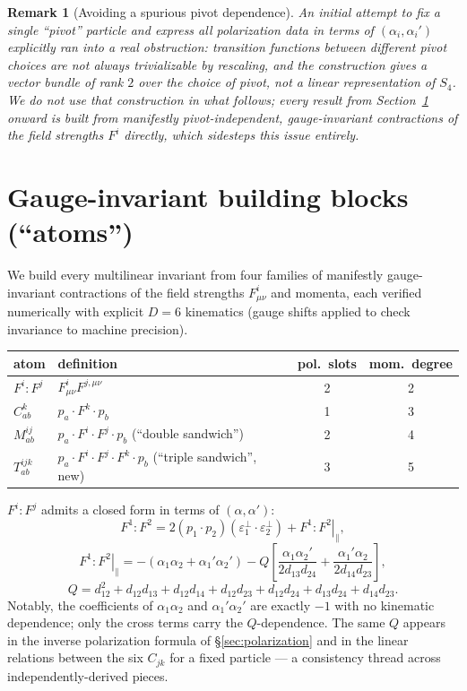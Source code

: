 \documentclass[reqno]{amsart}
\newtheorem{remark}[theorem]{Remark}
\begin{document}
\begin{remark}[Avoiding a spurious pivot dependence]
An initial attempt to fix a single ``pivot'' particle and express all polarization data in terms
of $(\alpha_i,\alpha_i')$ explicitly ran into a real obstruction: transition functions between
different pivot choices are not always trivializable by rescaling, and the construction gives a
\emph{vector bundle of rank $2$ over the choice of pivot}, not a linear representation of $S_4$.
We do not use that construction in what follows; every result from Section~\ref{sec:atoms} onward
is built from manifestly pivot-independent, gauge-invariant contractions of the field strengths
$F^i$ directly, which sidesteps this issue entirely.
\end{remark}

\section{Gauge-invariant building blocks (``atoms'')}
\label{sec:atoms}

We build every multilinear invariant from four families of manifestly gauge-invariant
contractions of the field strengths $F^i_{\mu\nu}$ and momenta, each verified numerically with
explicit $D=6$ kinematics (gauge shifts applied to check invariance to machine precision).

\begin{center}
\small
\begin{tabular}{@{}l p{5.2cm} c c@{}}
\hline
atom & definition & pol.\ slots & mom.\ degree \\
\hline
$F^i{:}F^j$ & $F^i_{\mu\nu}F^{j,\mu\nu}$ & 2 & 2 \\[2pt]
$C^k_{ab}$ & $p_a\cdot F^k\cdot p_b$ & 1 & 3 \\[2pt]
$M^{ij}_{ab}$ & $p_a\cdot F^i\cdot F^j\cdot p_b$ (``double sandwich'') & 2 & 4 \\[2pt]
$T^{ijk}_{ab}$ & $p_a\cdot F^i\cdot F^j\cdot F^k\cdot p_b$ (``triple sandwich'', new) & 3 & 5 \\
\hline
\end{tabular}
\end{center}

$F^i{:}F^j$ admits a closed form in terms of $(\alpha,\alpha')$:
\[
F^1{:}F^2 = 2(p_1\cdot p_2)(\varepsilon_1^\perp\cdot\varepsilon_2^\perp) + \left.F^1{:}F^2\right|_\parallel,
\]
\[
\left.F^1{:}F^2\right|_\parallel = -(\alpha_1\alpha_2+\alpha_1'\alpha_2')
- Q\left[\frac{\alpha_1\alpha_2'}{2d_{13}d_{24}}+\frac{\alpha_1'\alpha_2}{2d_{14}d_{23}}\right],
\]
\[
Q = d_{12}^2+d_{12}d_{13}+d_{12}d_{14}+d_{12}d_{23}+d_{12}d_{24}+d_{13}d_{24}+d_{14}d_{23}.
\]
Notably, the coefficients of $\alpha_1\alpha_2$ and $\alpha_1'\alpha_2'$ are exactly $-1$ with no
kinematic dependence; only the cross terms carry the $Q$-dependence. The same $Q$ appears in the
inverse polarization formula of \S\ref{sec:polarization} and in the linear relations between the
six $C_{jk}$ for a fixed particle --- a consistency thread across independently-derived pieces.
\end{document}
